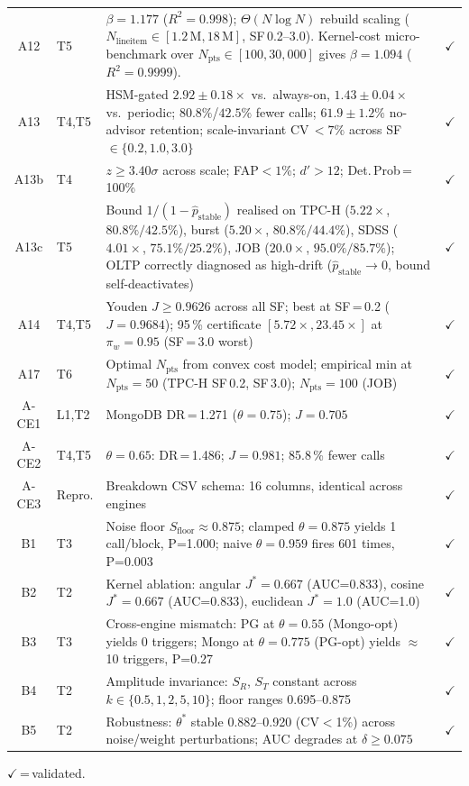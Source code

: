 \documentclass[10pt,journal,compsoc]{IEEEtran}
\newcommand{\Npts}{N_{\mathrm{pts}}}
\begin{document}
\begin{table}[!htb]
\begin{tabular}{@{}clp{4.8cm}c@{}}
A12 & T5   & $\beta\!=\!1.177$ ($R^2\!=\!0.998$); $\Theta(N\log N)$ rebuild scaling ($N_{\mathrm{lineitem}}\!\in\![1.2\,\mathrm{M},18\,\mathrm{M}]$, SF\,0.2--3.0). Kernel-cost micro-benchmark over $\Npts\!\in\![100,30{,}000]$ gives $\beta\!=\!1.094$ ($R^2\!=\!0.9999$). & $\checkmark$\\
A13 & T4,T5 & HSM-gated $2.92\!\pm\!0.18\!\times$ vs.\ always-on, $1.43\!\pm\!0.04\!\times$ vs.\ periodic; $80.8\%$/$42.5\%$ fewer calls; $61.9\!\pm\!1.2\%$ no-advisor retention; scale-invariant CV\,$<\!7\%$ across SF\,$\in\{0.2,1.0,3.0\}$ & $\checkmark$\\
A13b & T4 & $z\!\ge\!3.40\sigma$ across scale; FAP$\!<\!1$\%; $d'\!>\!12$; Det.\,Prob\,=\,100\% & $\checkmark$\\
A13c & T5 & Bound $1/(1\!-\!\hat{p}_{\mathrm{stable}})$ realised on TPC-H ($5.22\times$, $80.8\%/42.5\%$), burst ($5.20\times$, $80.8\%/44.4\%$), SDSS ($4.01\times$, $75.1\%/25.2\%$), JOB ($20.0\times$, $95.0\%/85.7\%$); OLTP correctly diagnosed as high-drift ($\hat{p}_{\mathrm{stable}}\!\to\!0$, bound self-deactivates) & $\checkmark$\\
A14 & T4,T5 & Youden $J\!\ge\!0.9626$ across all SF; best at SF\,=\,0.2 ($J\!=\!0.9684$); 95\,\% certificate $[5.72\!\times\!,23.45\!\times]$ at $\pi_w\!=\!0.95$ (SF\,=\,3.0 worst) & $\checkmark$\\
A17 & T6   & Optimal $\Npts$ from convex cost model; empirical min at $\Npts\!=\!50$ (TPC-H SF\,0.2, SF\,3.0); $\Npts\!=\!100$ (JOB) & $\checkmark$\\
\midrule
A-CE1 & L1,T2 & MongoDB DR\,=\,1.271 ($\theta\!=\!0.75$); $J\!=\!0.705$ & $\checkmark$\\
A-CE2 & T4,T5 & $\theta\!=\!0.65$: DR\,=\,1.486; $J\!=\!0.981$; 85.8\,\% fewer calls  & $\checkmark$\\
A-CE3 & Repro.& Breakdown CSV schema: 16 columns, identical across engines & $\checkmark$\\
\midrule
B1 & T3 & Noise floor $S_{\mathrm{floor}}\!\approx\!0.875$; clamped $\theta\!=\!0.875$ yields 1 call/block, P=1.000; naive $\theta\!=\!0.959$ fires 601 times, P=0.003 & $\checkmark$\\
B2 & T2 & Kernel ablation: angular $J^*\!=\!0.667$ (AUC=0.833), cosine $J^*\!=\!0.667$ (AUC=0.833), euclidean $J^*\!=\!1.0$ (AUC=1.0) & $\checkmark$\\
B3 & T3 & Cross-engine mismatch: PG at $\theta\!=\!0.55$ (Mongo-opt) yields 0 triggers; Mongo at $\theta\!=\!0.775$ (PG-opt) yields $\approx$10 triggers, P=0.27 & $\checkmark$\\
B4 & T2 & Amplitude invariance: $S_R$, $S_T$ constant across $k\in\{0.5,1,2,5,10\}$; floor ranges 0.695--0.875 & $\checkmark$\\
B5 & T2 & Robustness: $\theta^*$ stable 0.882--0.920 (CV$<$1\%) across noise/weight perturbations; AUC degrades at $\delta\geq0.075$ & $\checkmark$\\
\bottomrule
\end{tabular}
\par\smallskip $\checkmark$\,=\,validated.
\end{table}
\end{document}
